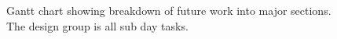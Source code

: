 \begin{figure}[tbh]
\caption{\protect\label{gantt}Gantt chart showing breakdown of future work into major sections. The design group is all sub day tasks.}
\end{figure}

